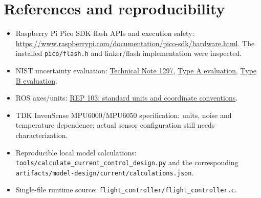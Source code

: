 \chapter*{References and reproducibility}
\begin{itemize}
\item Raspberry Pi Pico SDK flash APIs and execution safety:
\url{https://www.raspberrypi.com/documentation/pico-sdk/hardware.html}.
The installed \texttt{pico/flash.h} and linker/flash implementation were inspected.
\item NIST uncertainty evaluation:
\href{https://www.nist.gov/pml/nist-technical-note-1297}{Technical Note 1297},
\href{https://physics.nist.gov/cuu/Uncertainty/typea.html}{Type A evaluation},
\href{https://physics.nist.gov/cuu/Uncertainty/typeb.html}{Type B evaluation}.
\item ROS axes/units:
\href{https://raw.githubusercontent.com/ros-infrastructure/rep/master/rep-0103.rst}{REP 103: standard units and coordinate conventions}.
\item TDK InvenSense MPU6000/MPU6050 specification: units, noise and temperature
dependence; actual sensor configuration still needs characterization.
\item Reproducible local model calculations:
\texttt{tools/calculate\_current\_control\_design.py} and the corresponding
\texttt{artifacts/model-design/current/calculations.json}.
\item Single-file runtime source:
\texttt{flight\_controller/flight\_controller.c}.
\end{itemize}
